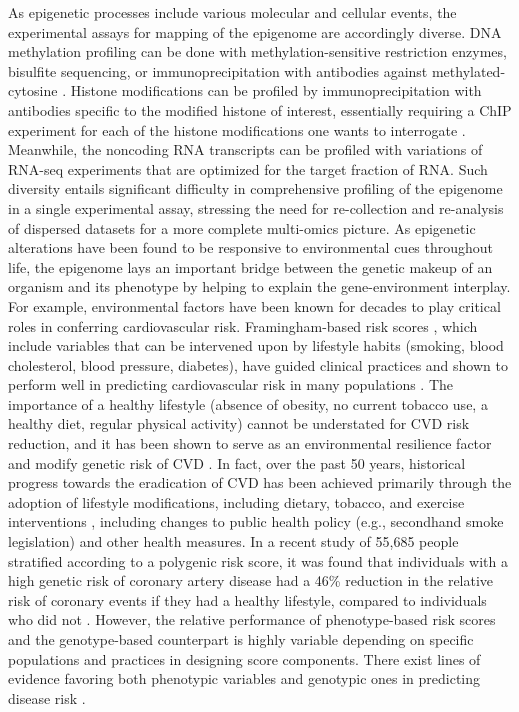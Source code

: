 \documentclass[letter]{bib}
\newcounter{example}[subsection]
\begin{document}
	As epigenetic processes include various molecular and cellular events, the experimental assays for mapping of the epigenome are accordingly diverse. DNA methylation profiling can be done with methylation-sensitive restriction enzymes, bisulfite sequencing, or immunoprecipitation with antibodies against methylated-cytosine \citep{Bibikova:2010:Genomewide}. Histone modifications can be profiled by immunoprecipitation with antibodies specific to the modified histone of interest, essentially requiring a ChIP experiment for each of the histone modifications one wants to interrogate \citep{Kimura:2013:Histone}. Meanwhile, the noncoding RNA transcripts can be profiled with variations of RNA-seq experiments that are optimized for the target fraction of RNA. Such diversity entails significant difficulty in comprehensive profiling of the epigenome in a single experimental assay, stressing the need for re-collection and re-analysis of dispersed datasets for a more complete multi-omics picture. As epigenetic alterations have been found to be responsive to environmental cues throughout life, the epigenome lays an important bridge between the genetic makeup of an organism and its phenotype by helping to explain the gene-environment interplay.
	For example, environmental factors have been known for decades to play critical roles in conferring cardiovascular risk. Framingham-based risk scores \citep{Sheridan:2003:Framinghambased}, which include variables that can be intervened upon by lifestyle habits (smoking, blood cholesterol, blood pressure, diabetes), have guided clinical practices \citep{British:1998:Joint} and shown to perform well in predicting cardiovascular risk in many populations \citep{Knuiman:1997:Prediction,Eichler:2007:Prediction}. The importance of a healthy lifestyle (absence of obesity, no current tobacco use, a healthy diet, regular physical activity) cannot be understated for CVD risk reduction, and it has been shown to serve as an environmental resilience factor and modify genetic risk of CVD \citep{Leopold:2018:Emerging}.  In fact, over the past 50 years, historical progress towards the eradication of CVD has been achieved primarily through the adoption of lifestyle modifications, including dietary, tobacco, and exercise interventions \citep{Leopold:2018:Emerging}, including changes to public health policy (e.g., secondhand smoke legislation) and other health measures.  In a recent study of 55,685 people stratified according to a polygenic risk score, it was found that individuals with a high genetic risk of coronary artery disease had a 46\% reduction in the relative risk of coronary events if they had a healthy lifestyle, compared to individuals who did not \citep{Khera:2016:Genetic}.  However, the relative performance of phenotype-based risk scores and the genotype-based counterpart is highly variable depending on specific populations and practices in designing score components. There exist lines of evidence favoring both phenotypic variables \citep{Talmud:2010:Utility} and genotypic ones in predicting disease risk \citep{DAgostino:2001:Validation,Empana:2003:Are,Eichler:2007:Prediction,Zomer:2014:Cardiovascular}.
\end{document}
